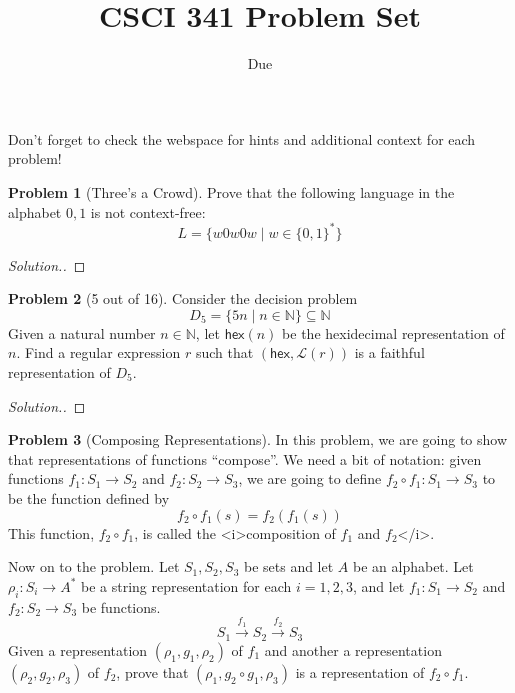 \documentclass[11pt]{article}
\title{CSCI 341 Problem Set \pset}
\author{\subtitle}
\date{Due
    \duedate
}
\theoremstyle{theorem} %
\theoremstyle{definition} %
\newtheorem{problem}                    {{\color{BurntOrange}Problem}}
\theoremstyle{remark} %
\begin{document}
\maketitle

Don't forget to check the webspace for hints and additional context for each problem!

\begin{problem}
    [Three's a Crowd]
    Prove that the following language in the alphabet \(0,1\) is not context-free:
    \[
        L = \{w 0 w 0 w \mid w \in \{0,1\}^*\}
    \]
\end{problem}

\begin{proof}[Solution.]
    
\end{proof}

\begin{problem}
    [5 out of 16]
    Consider the decision problem 
    \[
        D_5 = \{5n \mid n \in \mathbb N\} \subseteq \mathbb{N}
    \]
    Given a natural number \(n\in \mathbb N\), let \(\mathsf{hex}(n)\) be the hexidecimal representation of \(n\). 
    Find a regular expression \(r\) such that \((\mathsf{hex}, \mathcal L(r))\) is a faithful representation of \(D_5\).
\end{problem}

\begin{proof}[Solution.]
    
\end{proof}

\begin{problem}
    [Composing Representations]
    In this problem, we are going to show that representations of functions ``compose''.
    We need a bit of notation: given functions \(f_1 \colon S_1 \to S_2\) and \(f_2 \colon S_2 \to S_3\), we are going to define \(f_2 \circ f_1 \colon S_1 \to S_3\) to be the function defined by 
    \[
        f_2 \circ f_1(s) = f_2(f_1(s))
    \]
    This function, \(f_2 \circ f_1\), is called the <i>composition of \(f_1\) and \(f_2\)</i>.

    Now on to the problem.
    Let \(S_1,S_2,S_3\) be sets and let \(A\) be an alphabet.
    Let \(\rho_i \colon S_i \to A^*\) be a string representation for each \(i = 1,2,3\), and let \(f_1 \colon S_1 \to S_2\) and \(f_2 \colon S_2 \to S_3\) be functions. 
    \[
        S_1 \xrightarrow{f_1} S_2 \xrightarrow{f_2} S_3
    \]
    Given a representation \((\rho_1, g_1, \rho_2)\) of \(f_1\) and another a representation \((\rho_2, g_2, \rho_3)\) of \(f_2\), prove that \((\rho_1, g_2 \circ g_1, \rho_3)\) is a representation of \(f_2 \circ f_1\).
\end{problem}
\end{document}
